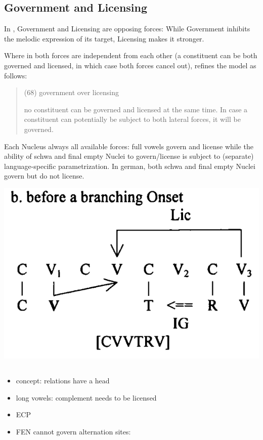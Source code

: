 \subsection{Government and Licensing}
\label{subsec:intro:gov lic}

In \CVCV, Government and Licensing are opposing forces:
While Government inhibits the melodic expression of
its target, Licensing makes it stronger.

Where in \cite{scheer2004} both forces are independent
from each other (a constituent can be both governed
and licensed, in which case both forces cancel out),
\cite{scheer2012} refines the model as follows:
\blockquote[\cite{scheer2012}]{
  (68) government over licensing
  
  no constituent can be governed and licensed at the
  same time. In case a constituent can potentially be
  subject to both lateral forces, it will be governed.
}

Each Nucleus always 
all available forces: full vowels govern and license
while the ability of schwa and final empty Nuclei to
govern/license is subject to (separate) language-specific
parametrization.
In german, both schwa and final empty Nuclei govern but
do not license.

\includegraphics[width=.5\textwidth]{figures/lic-over-branching-onset.png}


\subsection[TODO]{\TODO{}}
\begin{itemize}\color{red}
  \item concept: relations have a head
  \item long vowels: complement needs to be licensed
  \item \gls{ECP}
  \item FEN cannot govern alternation sites:\\
\end{itemize}